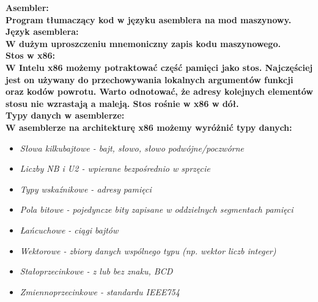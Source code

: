 \documentclass[a4paper,12pt]{article}
\newcommand{\h}[1]{\noindent \bf #1 \rm \\ \noindent}
\newcommand{\italic}[1]{\it #1 \rm}
\begin{document}
\h{Asembler:}
Program tłumaczący kod w języku asemblera na mod maszynowy.\\

\h{Język asemblera:}
W dużym uproszczeniu mnemoniczny zapis kodu maszynowego.\\

\h{Stos w x86:}
W Intelu x86 możemy potraktować część pamięci jako stos. Najczęściej jest on używany do przechowywania lokalnych argumentów funkcji oraz kodów powrotu. Warto odnotować, że adresy kolejnych elementów stosu nie wzrastają a maleją. Stos rośnie w x86 w dół.\\

\h{Typy danych w asemblerze:}
W asemblerze na architekturę x86 możemy wyróżnić typy danych:
\begin{itemize}
	\item \italic{Słowa kilkubajtowe} - bajt, słowo, słowo podwójne/poczwórne
	\item \italic{Liczby NB i U2} - wpierane bezpośrednio w sprzęcie
	\item \italic{Typy wskaźnikowe} - adresy  pamięci
	\item \italic{Pola bitowe} - pojedyncze bity zapisane w oddzielnych segmentach pamięci
	\item \italic{Łańcuchowe} - ciągi bajtów
	\item \italic{Wektorowe} - zbiory danych wspólnego typu (np. wektor liczb integer)
	\item \italic{Stałoprzecinkowe} - z lub bez znaku, BCD
	\item \italic{Zmiennoprzecinkowe} - standardu IEEE754
\end{itemize}
\end{document}
